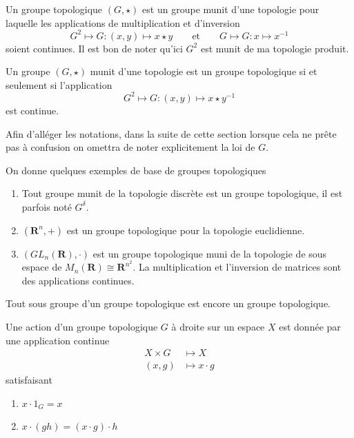 \documentclass[main.tex]{subfiles}
\begin{document}
	\begin{definition}
		Un groupe topologique $(G,\star)$ est un groupe munit d'une topologie pour laquelle les applications de multiplication et d'inversion \[
			G^2 \longmapsto G : (x,y) \longmapsto x \star y \qquad \text{et} \qquad G \longmapsto G : x \longmapsto x^{-1}
		\] soient continues. Il est bon de noter qu'ici $G^2$ est munit de ma topologie produit. 
	\end{definition}

	\begin{prop}
		Un groupe $(G,\star)$ munit d'une topologie est un groupe topologique si et seulement si l'application  \[
			G^2 \longmapsto G : (x,y) \longmapsto x \star y^{-1}
		\] est continue. 
	\end{prop}
	Afin d'alléger les notations, dans la suite de cette section lorsque cela ne prête pas à confusion on omettra de noter explicitement la loi de $G$. 

	\begin{example} On donne quelques exemples de base de groupes topologiques
		\begin{enumerate}
			\item Tout groupe munit de la topologie discrète est un groupe topologique, il est parfois noté $G^{\delta}$.
			\item $(\mathbf{R}^n,+)$ est un groupe topologique pour la topologie euclidienne.
			\item $(GL_n(\mathbf{R}),\cdot)$ est un groupe topologique muni de la topologie de sous espace de $M_n(\mathbf{R}) \cong \mathbf{R}^{n^2}$. La multiplication et l'inversion de matrices sont des applications continues. 
		\end{enumerate}	
	\end{example}

	\begin{lemma}
		Tout sous groupe d'un groupe topologique est encore un groupe topologique.
	\end{lemma}

	\begin{definition}
		Une action d'un groupe topologique $G$ à droite sur un espace $X$ est donnée par une application continue
		\begin{align*}
			X \times G &\longmapsto X \\
			(x,g) &\longmapsto x\cdot g
		\end{align*} satisfaisant 

		\begin{enumerate}
			\item $x \cdot 1_G = x$
			\item $x \cdot (gh) = (x \cdot g)\cdot h$
		\end{enumerate}
	\end{definition}
\end{document}
